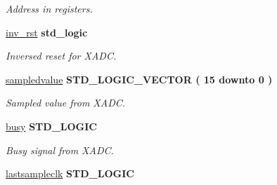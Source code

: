 \begin{DoxyCompactItemize}
\begin{DoxyCompactList}\small\item\em Address in registers. \end{DoxyCompactList}\item 
\hypertarget{classADC__TOP_1_1Behavioral_ac58565a65b10392b2476534d234c8871}{\hyperlink{classADC__TOP_1_1Behavioral_ac58565a65b10392b2476534d234c8871}{inv\-\_\-rst} {\bfseries \textcolor{comment}{std\-\_\-logic}\textcolor{vhdlchar}{ }} }\label{classADC__TOP_1_1Behavioral_ac58565a65b10392b2476534d234c8871}

\begin{DoxyCompactList}\small\item\em Inversed reset for X\-A\-D\-C. \end{DoxyCompactList}\item 
\hypertarget{classADC__TOP_1_1Behavioral_ad5797d4ae2d654477e555700f8c3e43f}{\hyperlink{classADC__TOP_1_1Behavioral_ad5797d4ae2d654477e555700f8c3e43f}{sampledvalue} {\bfseries \textcolor{comment}{S\-T\-D\-\_\-\-L\-O\-G\-I\-C\-\_\-\-V\-E\-C\-T\-O\-R}\textcolor{vhdlchar}{ }\textcolor{vhdlchar}{(}\textcolor{vhdlchar}{ }\textcolor{vhdlchar}{ } \textcolor{vhdldigit}{15} \textcolor{vhdlchar}{ }\textcolor{vhdlchar}{ }\textcolor{vhdlchar}{ }\textcolor{vhdlkeyword}{downto}\textcolor{vhdlchar}{ }\textcolor{vhdlchar}{ }\textcolor{vhdlchar}{ } \textcolor{vhdldigit}{0} \textcolor{vhdlchar}{ }\textcolor{vhdlchar}{)}\textcolor{vhdlchar}{ }} }\label{classADC__TOP_1_1Behavioral_ad5797d4ae2d654477e555700f8c3e43f}

\begin{DoxyCompactList}\small\item\em Sampled value from X\-A\-D\-C. \end{DoxyCompactList}\item 
\hypertarget{classADC__TOP_1_1Behavioral_a765e6fd5e52807fd480f8e8477f35144}{\hyperlink{classADC__TOP_1_1Behavioral_a765e6fd5e52807fd480f8e8477f35144}{busy} {\bfseries \textcolor{comment}{S\-T\-D\-\_\-\-L\-O\-G\-I\-C}\textcolor{vhdlchar}{ }} }\label{classADC__TOP_1_1Behavioral_a765e6fd5e52807fd480f8e8477f35144}

\begin{DoxyCompactList}\small\item\em Busy signal from X\-A\-D\-C. \end{DoxyCompactList}\item 
\hypertarget{classADC__TOP_1_1Behavioral_afda8ab14219d5cf291d97fd808265f14}{\hyperlink{classADC__TOP_1_1Behavioral_afda8ab14219d5cf291d97fd808265f14}{lastsampleclk} {\bfseries \textcolor{comment}{S\-T\-D\-\_\-\-L\-O\-G\-I\-C}\textcolor{vhdlchar}{ }} }\label{classADC__TOP_1_1Behavioral_afda8ab14219d5cf291d97fd808265f14}


\end{DoxyCompactItemize}
